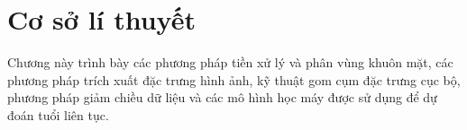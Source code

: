 



\chapter{Cơ sở lí thuyết}

Chương này trình bày các phương pháp tiền xử lý và phân vùng khuôn mặt, các phương pháp trích xuất đặc trưng hình ảnh, kỹ thuật gom cụm đặc trưng cục bộ, phương pháp giảm chiều dữ liệu và các mô hình học máy được sử dụng để dự đoán tuổi liên tục.

